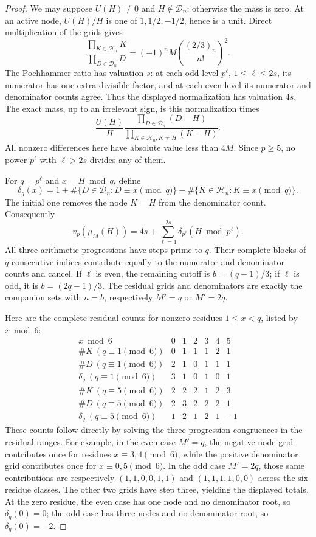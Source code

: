 \documentclass[11pt,letterpaper]{article}
\numberwithin{equation}{section}
\begin{document}
\begin{proof}
We may suppose $U(H)\ne0$ and $H\notin\mathcal D_n$; otherwise the
mass is zero. At an active node, $U(H)/H$ is one of
$1,1/2,-1/2$, hence is a unit. Direct multiplication of the grids gives
\[
 \frac{\prod_{K\in\mathcal H_n}K}{\prod_{D\in\mathcal D_n}D}
 =(-1)^nM\left(\frac{(2/3)_n}{n!}\right)^2.
\]
The Pochhammer ratio has valuation $s$: at each odd level
$p^\ell$, $1\le\ell\le2s$, its numerator has one extra divisible
factor, and at each even level its numerator and denominator counts
agree. Thus the displayed normalization has valuation $4s$.
The exact mass, up to an irrelevant sign, is this normalization times
\[
 \frac{U(H)}H
 \frac{\prod_{D\in\mathcal D_n}(D-H)}
 {\prod_{K\in\mathcal H_n,K\ne H}(K-H)}.
\]
All nonzero differences here have absolute value less than $4M$.
Since $p\ge5$, no power $p^\ell$ with $\ell>2s$ divides any of them.

For $q=p^\ell$ and $x=H\bmod q$, define
\[
 \delta_q(x)=1+\#\{D\in\mathcal D_n:D\equiv x\pmod q\}
 -\#\{K\in\mathcal H_n:K\equiv x\pmod q\}.
\]
The initial one removes the node $K=H$ from the denominator count.
Consequently
\begin{equation}\label{VII-E7:mass-count}
 v_p(\mu_M(H))=4s+\sum_{\ell=1}^{2s}\delta_{p^\ell}(H\bmod p^\ell).
\end{equation}
All three arithmetic progressions have steps prime to $q$.
Their complete blocks of $q$ consecutive indices contribute equally
to the numerator and denominator counts and cancel. If $\ell$ is
even, the remaining cutoff is $b=(q-1)/3$; if $\ell$ is odd,
it is $b=(2q-1)/3$. The residual grids and denominators are exactly
the companion sets with $n=b$, respectively $M'=q$ or $M'=2q$.

Here are the complete residual counts for nonzero residues
$1\le x<q$, listed by $x\bmod6$:
\[
\begin{array}{c|rrrrrr}
x\bmod6&0&1&2&3&4&5\\\hline
\#K\ (q\equiv1\pmod6)&0&1&1&1&2&1\\
\#D\ (q\equiv1\pmod6)&2&1&0&1&1&1\\
\delta_q\ (q\equiv1\pmod6)&3&1&0&1&0&1\\\hline
\#K\ (q\equiv5\pmod6)&2&2&2&1&2&3\\
\#D\ (q\equiv5\pmod6)&2&3&2&2&2&1\\
\delta_q\ (q\equiv5\pmod6)&1&2&1&2&1&-1
\end{array}
\]
These counts follow directly by solving the three progression
congruences in the residual ranges. For example, in the even case
$M'=q$, the negative node grid contributes once for residues
$x\equiv3,4\pmod6$, while the positive denominator grid contributes
once for $x\equiv0,5\pmod6$. In the odd case $M'=2q$, those same
contributions are respectively $(1,1,0,0,1,1)$ and
$(1,1,1,1,0,0)$ across the six residue classes. The other two grids
have step three, yielding the displayed totals.
At the zero residue, the even case has one node and no denominator
root, so $\delta_q(0)=0$; the odd case has three nodes and no
denominator root, so $\delta_q(0)=-2$.


\end{proof}
\end{document}
